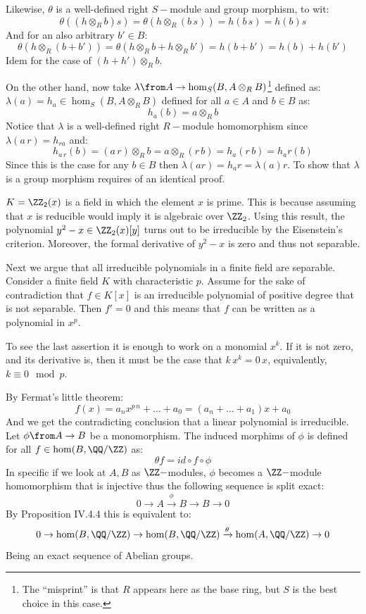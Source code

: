 Likewise, $\theta$ is a well-defined right $S-$module and group morphism, to wit:
$$\theta((h \otimes_ R b)s)=\theta(h \otimes_ R (b\, s))=h(b\, s)= h(b)s$$
And for an also arbitrary $b'\in B$:
$$\theta(h \otimes_ R (b+b'))=\theta(h \otimes_ R b+ h \otimes_ R b')=h(b+b')=h(b)+h(b')$$
Idem for the case of $(h+h')  \otimes_ R b$.

On the other hand, now take $\lambda \from A \to \hom_S(B,A\otimes_R B)$\footnote{The ``misprint''  is that $R$ appears here as the base ring, but $S$ is the best choice in this case.} defined as: $\lambda (a) = h_a\in \hom_S(B,A\otimes_R B)$ defined for all $a\in A$ and $b\in B$ as: 
$$h_a(b) = a \otimes_R b $$
Notice that $\lambda$ is a well-defined right $R-$module homomorphism since $\lambda(a\,r) = h_{ra}$ and:
$$h_{a\,r}(b) = (a\, r) \otimes_ R b = a \otimes_ R (r\,b)= h_a(r\, b) = h_ar(b)$$
Since this is the case for any $b\in B$ then $\lambda(ar)= h_a r= \lambda(a)r$. To show that $\lambda$ is a group morphism requires of  an identical proof.

$K=\ZZ_2(x)$ is a field in which the element $x$ is prime. This is because assuming that $x$ is reducible would imply it is algebraic over $\ZZ_2$. Using this result, the polynomial $y^2- x\in \ZZ_2(x)[y]$ turns out to be irreducible by the Eisenstein's criterion. Moreover, the formal derivative of $y^2-x$ is zero and thus not separable.

Next we argue that all irreducible polynomials in a finite field are separable. Consider a finite field $K$ with characteristic $p$. Assume for the sake of contradiction that $f\in K[x]$ is an irreducible polynomial of positive degree that is not separable. Then $f'=0$ and this means that $f$ can be written as a polynomial in $x^p$. 

To see the last assertion it is enough to work on a monomial $x^k$. If it is not zero, and its derivative is, then it must be the case that $k\, x^{k}=0\, x$, equivalently, $k\equiv 0 \mod p$.

By Fermat's little theorem:
$$f(x) = a_n x^{p\,n}+\ldots + a_0 = (a_n+\ldots +a_1)x +a_0$$
And we get the contradicting conclusion that a linear polynomial is irreducible.
Let $\phi \from A\to B$ be a monomorphism. The induced morphims of $\phi$ is defined for all $f\in \hom(B,\QQ/\ZZ)$ as: 
$$\theta f= id\circ f\circ \phi$$
In specific if we look at $A,B$ as $\ZZ-$modules,  $\phi$ becomes a $\ZZ-$module homomorphism that is injective thus the following sequence is split exact:
$$0\to A \xrightarrow \phi B \to B \to 0$$
By Proposition IV.4.4 this is equivalent to:
$$0\to \hom(B,\QQ/\ZZ) \to \hom(B,\QQ/\ZZ) \xrightarrow \theta \hom(A,\QQ/\ZZ) \to 0$$
Being an exact sequence of Abelian groups.

